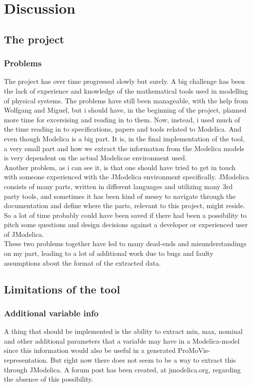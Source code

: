 \section{Discussion}
\subsection{The project}
\subsubsection{Problems}
The project has over time progressed slowly but surely. A big challenge has been the lack of experience and knowledge of the mathematical tools used in modelling of physical systems. The problems have still been manageable, with the help from Wolfgang and Miguel, but i should have, in the beginning of the project, planned more time for excersising and reading in to them. Now, instead, i used much of the time reading in to specifications, papers and tools related to Modelica. And even though Modelica is a big part. It is, in the final implementation of the tool, a very small part and how we extract the information from the Modelica models is very dependent on the actual Modelicae environment used.\\\newline Another problem, as i can see it, is that one should have tried to get in touch with someone experienced with the JModelica environment specifically. JModelica consists of many parts, written in different languages and utilizing many 3rd party tools, and sometimes it has been kind of messy to navigate through the documentation and define where the parts, relevant to this project, might reside. So a lot of time probably could have been saved if there had been a possibility to pitch some questions and design decisions against a developer or experienced user of JModelica.\\\newline These two problems together have led to many dead-ends and misunderstandings on my part, leading to a lot of additional work due to bugs and faulty assumptions about the format of the extracted data.
\subsection{Limitations of the tool}
\subsubsection{Additional variable info}
A thing that should be implemented is the ability to extract min, max, nominal and other additional parameters that a variable may have in a Modelica-model since this information would also be useful in a generated ProMoVis-representation. But right now there does not seem to be a way to extract this through JModelica. A forum post has been created, at jmodelica.org, regarding the absence of this possibility.
